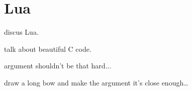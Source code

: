 \section{Lua}



discus Lua.

talk about beautiful C code.

argument shouldn't be that hard...

draw a long bow and make the argument it's close enough\ldots
